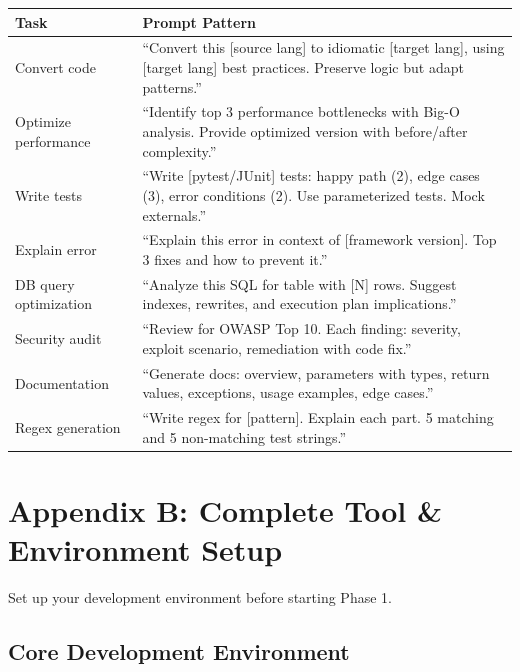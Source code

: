 \documentclass[11pt, a4paper, oneside]{report}
\begin{document}
{{\small
{}
\begin{longtable}{L{0.22\textwidth} L{0.68\textwidth}}
\toprule
\textbf{Task} & \textbf{Prompt Pattern} \\
\midrule
\endfirsthead
\bottomrule
\endlastfoot
Convert code & ``Convert this [source lang] to idiomatic [target lang], using [target lang] best practices. Preserve logic but adapt patterns.'' \\
Optimize performance & ``Identify top 3 performance bottlenecks with Big-O analysis. Provide optimized version with before/after complexity.'' \\
Write tests & ``Write [pytest/JUnit] tests: happy path (2), edge cases (3), error conditions (2). Use parameterized tests. Mock externals.'' \\
Explain error & ``Explain this error in context of [framework version]. Top 3 fixes and how to prevent it.'' \\
DB query optimization & ``Analyze this SQL for table with [N] rows. Suggest indexes, rewrites, and execution plan implications.'' \\
Security audit & ``Review for OWASP Top 10. Each finding: severity, exploit scenario, remediation with code fix.'' \\
Documentation & ``Generate docs: overview, parameters with types, return values, exceptions, usage examples, edge cases.'' \\
Regex generation & ``Write regex for [pattern]. Explain each part. 5 matching and 5 non-matching test strings.'' \\
\end{longtable}

\clearpage
\chapter[Tool \& Environment Setup]{Appendix B: Complete Tool \& Environment Setup}

Set up your development environment before starting Phase 1.

\section[Core Dev Environment]{Core Development Environment}

}}
\end{document}
